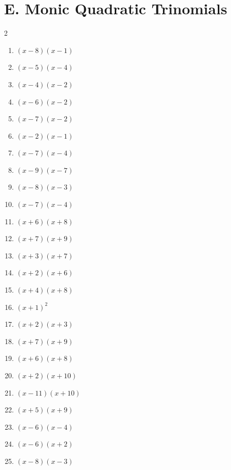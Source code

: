 \documentclass[11pt,oneside]{book}
\begin{document}
\section*{E. Monic Quadratic Trinomials}
\begin{multicols}{2}
\begin{enumerate}[leftmargin=*,label=\textbf{E\arabic*.},itemsep=0.45\baselineskip]
\item $ \left(x - 8\right) \left(x - 1\right) $
\item $ \left(x - 5\right) \left(x - 4\right) $
\item $ \left(x - 4\right) \left(x - 2\right) $
\item $ \left(x - 6\right) \left(x - 2\right) $
\item $ \left(x - 7\right) \left(x - 2\right) $
\item $ \left(x - 2\right) \left(x - 1\right) $
\item $ \left(x - 7\right) \left(x - 4\right) $
\item $ \left(x - 9\right) \left(x - 7\right) $
\item $ \left(x - 8\right) \left(x - 3\right) $
\item $ \left(x - 7\right) \left(x - 4\right) $
\item $ \left(x + 6\right) \left(x + 8\right) $
\item $ \left(x + 7\right) \left(x + 9\right) $
\item $ \left(x + 3\right) \left(x + 7\right) $
\item $ \left(x + 2\right) \left(x + 6\right) $
\item $ \left(x + 4\right) \left(x + 8\right) $
\item $ \left(x + 1\right)^{2} $
\item $ \left(x + 2\right) \left(x + 3\right) $
\item $ \left(x + 7\right) \left(x + 9\right) $
\item $ \left(x + 6\right) \left(x + 8\right) $
\item $ \left(x + 2\right) \left(x + 10\right) $
\item $ \left(x - 11\right) \left(x + 10\right) $
\item $ \left(x + 5\right) \left(x + 9\right) $
\item $ \left(x - 6\right) \left(x - 4\right) $
\item $ \left(x - 6\right) \left(x + 2\right) $
\item $ \left(x - 8\right) \left(x - 3\right) $

\end{enumerate}
\end{multicols}
\end{document}
